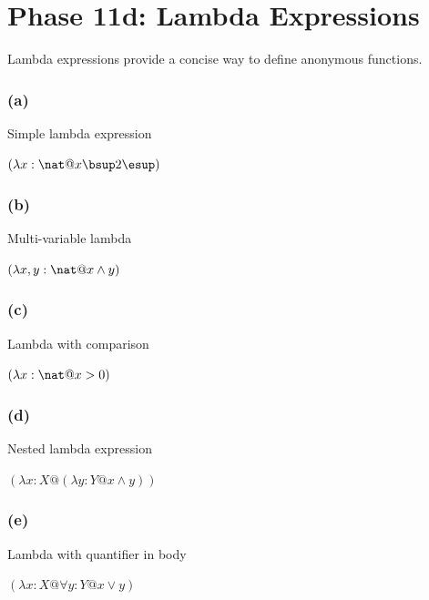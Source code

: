 \documentclass[a4paper,10pt,fleqn]{article}
\begin{document}
\section*{Phase 11d: Lambda Expressions}

\noindent Lambda expressions provide a concise way to define anonymous functions.

\bigskip

\medskip

\subsubsection*{(a)}

\noindent Simple lambda expression

\bigskip

\noindent
$(\lambda x : \nat @ x \bsup 2 \esup)$


\medskip

\subsubsection*{(b)}

\noindent Multi-variable lambda

\bigskip

\noindent
$(\lambda x, y : \nat @ x \land y)$


\medskip

\subsubsection*{(c)}

\noindent Lambda with comparison

\bigskip

\noindent
$(\lambda x : \nat @ x > 0)$


\medskip

\subsubsection*{(d)}

\noindent Nested lambda expression

\bigskip

\noindent
$(\lambda x : X @ (\lambda y : Y @ x \land y))$


\medskip

\subsubsection*{(e)}

\noindent Lambda with quantifier in body

\bigskip

\noindent
$(\lambda x : X @ \forall y : Y @ x \lor y)$
\end{document}
